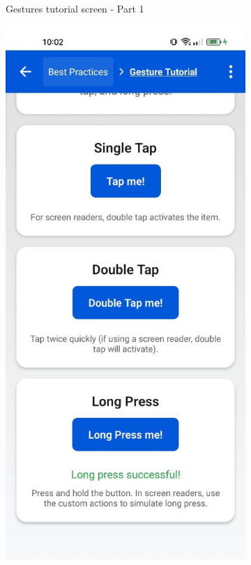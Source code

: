 \begin{enumerate}
\begin{itemize}
\begin{figure}[ht]
\begin{subfigure}[b]{0.48\textwidth}
                \caption{Gestures tutorial screen - Part 1}
                \label{fig:gestures-left}
            \end{subfigure}
            \hfill
            \begin{subfigure}[b]{0.48\textwidth}
                \centering
                \includegraphics[width=\linewidth, alt={Second part of the Gestures tutorial screen}]{img/gestures2.jpg}

\end{subfigure}
\end{figure}
\end{itemize}
\end{enumerate}
